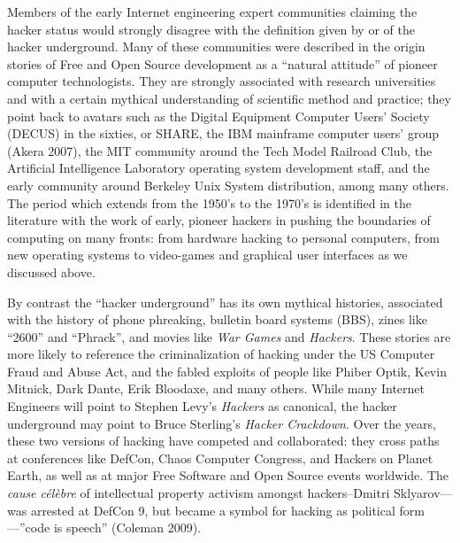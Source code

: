 \documentclass[10pt,letter,oneside]{scrartcl}
\begin{document}
Members of the early Internet engineering expert communities claiming the
hacker status would strongly disagree with the definition given by or of the
hacker underground. Many of these communities were described in the origin
stories of Free and Open Source development as a ``natural attitude'' of
pioneer computer technologists.  They are strongly associated with research
universities and with a certain mythical understanding of scientific method and
practice; they point back to avatars such as the Digital Equipment Computer
Users' Society (DECUS) in the sixties, or SHARE, the IBM mainframe computer
users' group (Akera 2007), the MIT community around the Tech Model Railroad
Club, the Artificial Intelligence Laboratory operating system development
staff, and the early community around Berkeley Unix System distribution, among
many others.  The period which extends from the 1950's to the 1970's is
identified in the literature with the work of early, pioneer hackers in pushing
the boundaries of computing on many fronts: from hardware hacking to personal
computers, from new operating systems to video-games and graphical user
interfaces as we discussed above.

By contrast the ``hacker underground'' has its own mythical histories,
associated with the history of phone phreaking, bulletin board systems (BBS),
zines like ``2600'' and ``Phrack'', and movies like \emph{War Games} and
\emph{Hackers}.  These stories are more likely to reference the criminalization
of hacking under the US Computer Fraud and Abuse Act, and the fabled exploits
of people like Phiber Optik, Kevin Mitnick, Dark Dante, Erik Bloodaxe, and many
others.  While many Internet Engineers will point to Stephen Levy's
\emph{Hackers} as canonical, the hacker underground may point to Bruce
Sterling's \emph{Hacker Crackdown}.  Over the years, these two versions of
hacking have competed and collaborated: they cross paths at conferences like
DefCon, Chaos Computer Congress, and Hackers on Planet Earth, as well as at
major Free Software and Open Source events worldwide.  The \emph{cause célèbre}
of intellectual property activism amongst hackers--Dmitri Sklyarov---was
arrested at DefCon 9, but became a symbol for hacking as political
form---''code is speech'' (Coleman 2009). 


\end{document}
